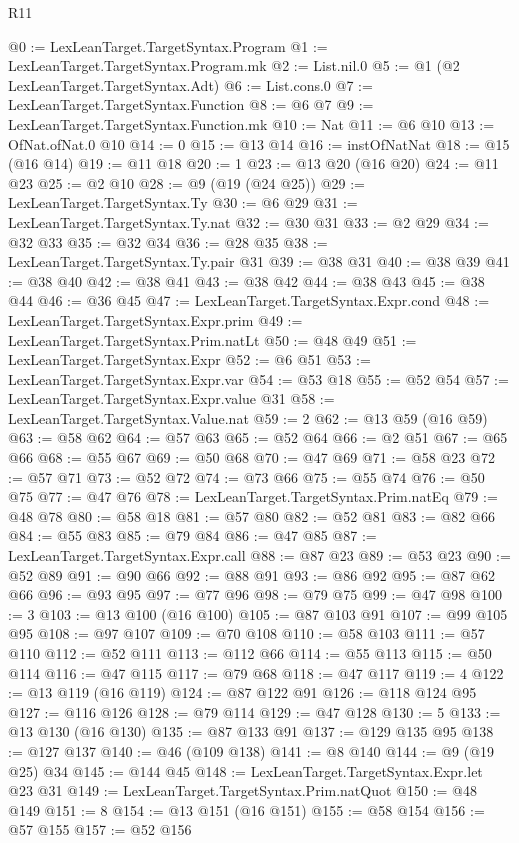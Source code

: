 \begin{lexlean}{R11}
\begin{coremodule}
@0 := LexLeanTarget.TargetSyntax.Program
@1 := LexLeanTarget.TargetSyntax.Program.mk
@2 := List.nil.{0}
@5 := @1 (@2 LexLeanTarget.TargetSyntax.Adt)
@6 := List.cons.{0}
@7 := LexLeanTarget.TargetSyntax.Function
@8 := @6 @7
@9 := LexLeanTarget.TargetSyntax.Function.mk
@10 := Nat
@11 := @6 @10
@13 := OfNat.ofNat.{0} @10
@14 := 0
@15 := @13 @14
@16 := instOfNatNat
@18 := @15 (@16 @14)
@19 := @11 @18
@20 := 1
@23 := @13 @20 (@16 @20)
@24 := @11 @23
@25 := @2 @10
@28 := @9 (@19 (@24 @25))
@29 := LexLeanTarget.TargetSyntax.Ty
@30 := @6 @29
@31 := LexLeanTarget.TargetSyntax.Ty.nat
@32 := @30 @31
@33 := @2 @29
@34 := @32 @33
@35 := @32 @34
@36 := @28 @35
@38 := LexLeanTarget.TargetSyntax.Ty.pair @31
@39 := @38 @31
@40 := @38 @39
@41 := @38 @40
@42 := @38 @41
@43 := @38 @42
@44 := @38 @43
@45 := @38 @44
@46 := @36 @45
@47 := LexLeanTarget.TargetSyntax.Expr.cond
@48 := LexLeanTarget.TargetSyntax.Expr.prim
@49 := LexLeanTarget.TargetSyntax.Prim.natLt
@50 := @48 @49
@51 := LexLeanTarget.TargetSyntax.Expr
@52 := @6 @51
@53 := LexLeanTarget.TargetSyntax.Expr.var
@54 := @53 @18
@55 := @52 @54
@57 := LexLeanTarget.TargetSyntax.Expr.value @31
@58 := LexLeanTarget.TargetSyntax.Value.nat
@59 := 2
@62 := @13 @59 (@16 @59)
@63 := @58 @62
@64 := @57 @63
@65 := @52 @64
@66 := @2 @51
@67 := @65 @66
@68 := @55 @67
@69 := @50 @68
@70 := @47 @69
@71 := @58 @23
@72 := @57 @71
@73 := @52 @72
@74 := @73 @66
@75 := @55 @74
@76 := @50 @75
@77 := @47 @76
@78 := LexLeanTarget.TargetSyntax.Prim.natEq
@79 := @48 @78
@80 := @58 @18
@81 := @57 @80
@82 := @52 @81
@83 := @82 @66
@84 := @55 @83
@85 := @79 @84
@86 := @47 @85
@87 := LexLeanTarget.TargetSyntax.Expr.call
@88 := @87 @23
@89 := @53 @23
@90 := @52 @89
@91 := @90 @66
@92 := @88 @91
@93 := @86 @92
@95 := @87 @62 @66
@96 := @93 @95
@97 := @77 @96
@98 := @79 @75
@99 := @47 @98
@100 := 3
@103 := @13 @100 (@16 @100)
@105 := @87 @103 @91
@107 := @99 @105 @95
@108 := @97 @107
@109 := @70 @108
@110 := @58 @103
@111 := @57 @110
@112 := @52 @111
@113 := @112 @66
@114 := @55 @113
@115 := @50 @114
@116 := @47 @115
@117 := @79 @68
@118 := @47 @117
@119 := 4
@122 := @13 @119 (@16 @119)
@124 := @87 @122 @91
@126 := @118 @124 @95
@127 := @116 @126
@128 := @79 @114
@129 := @47 @128
@130 := 5
@133 := @13 @130 (@16 @130)
@135 := @87 @133 @91
@137 := @129 @135 @95
@138 := @127 @137
@140 := @46 (@109 @138)
@141 := @8 @140
@144 := @9 (@19 @25) @34
@145 := @144 @45
@148 := LexLeanTarget.TargetSyntax.Expr.let @23 @31
@149 := LexLeanTarget.TargetSyntax.Prim.natQuot
@150 := @48 @149
@151 := 8
@154 := @13 @151 (@16 @151)
@155 := @58 @154
@156 := @57 @155
@157 := @52 @156

\end{coremodule}
\end{lexlean}
